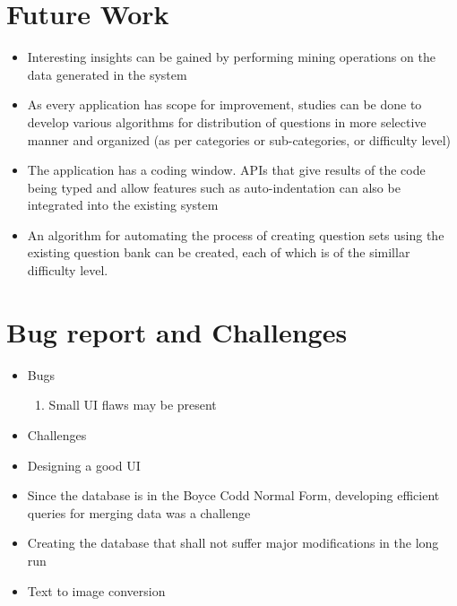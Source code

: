 \documentclass[a4paper,12pt,oneside]{book}
\begin{document}
\section{Future Work}
    \begin{itemize}
        \item Interesting insights can be gained by performing mining operations on the data generated in the system
        
        \item As every application has scope for improvement, studies can be done to develop various algorithms for distribution of questions in more selective manner and organized (as per categories or sub-categories, or difficulty level)
        
        \item The application has a coding window. APIs that give results of the code being typed and allow features such as auto-indentation can also be integrated into the existing system
        
        \item An algorithm for automating the process of creating question sets using the existing question bank can be created, each of which is of the simillar difficulty level.
    \end{itemize}

\section{Bug report and Challenges}
    \begin{itemize}
      \item Bugs
        \begin{enumerate}
          \item Small UI flaws may be present
        \end{enumerate}
      \item Challenges
           \item Designing a good UI
           \item Since the database is in the Boyce Codd Normal Form, developing efficient queries for merging data was a challenge
           \item Creating the database that shall not suffer major modifications in the long run
           \item Text to image conversion
    \end{itemize}
\end{document}
